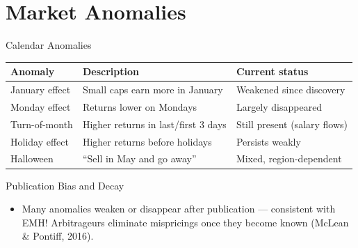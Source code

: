 \documentclass[9pt, aspectratio=169, t]{beamer}
\theoremstyle{definition}
\newenvironment{cminipage}[1]{%
    \par\noindent\hfill\begin{minipage}{#1}\ignorespaces
}{%
    \end{minipage}\hfill\null\par
}
\begin{document}
\section{Market Anomalies}

\begin{frame}{Calendar Anomalies}
\begin{cminipage}{0.95\textwidth}
\small
\renewcommand{\arraystretch}{1.2}
\begin{center}
\scriptsize
\renewcommand{\arraystretch}{1.3}
\begin{tabular}{lll}
\toprule
\textbf{Anomaly} & \textbf{Description} & \textbf{Current status} \\
\midrule
January effect & Small caps earn more in January & Weakened since discovery \\
Monday effect & Returns lower on Mondays & Largely disappeared \\
Turn-of-month & Higher returns in last/first 3 days & Still present (salary flows) \\
Holiday effect & Higher returns before holidays & Persists weakly \\
Halloween & ``Sell in May and go away'' & Mixed, region-dependent \\
\bottomrule
\end{tabular}
\end{center}

\vspace{0.2cm}
\begin{alertblock}{Publication Bias and Decay}
\begin{itemize}\setlength{\itemsep}{0pt}
    \item Many anomalies weaken or disappear after publication --- consistent with EMH! Arbitrageurs eliminate mispricings once they become known (McLean \& Pontiff, 2016).
\end{itemize}
\end{alertblock}
\end{cminipage}
\end{frame}
\end{document}
